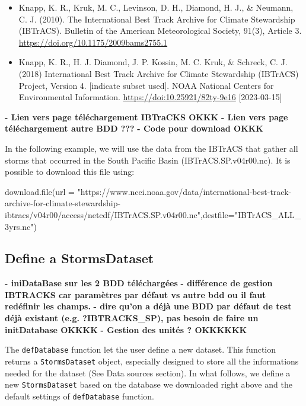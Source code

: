 \documentclass[
]{article}
\newenvironment{Shaded}{\begin{snugshade}}{\end{snugshade}}
\newcommand{\AttributeTok}[1]{\textcolor[rgb]{0.77,0.63,0.00}{#1}}
\newcommand{\FunctionTok}[1]{\textcolor[rgb]{0.00,0.00,0.00}{#1}}
\newcommand{\NormalTok}[1]{#1}
\newcommand{\StringTok}[1]{\textcolor[rgb]{0.31,0.60,0.02}{#1}}
\begin{document}
\begin{itemize}
\item
  Knapp, K. R., Kruk, M. C., Levinson, D. H., Diamond, H. J., \&
  Neumann, C. J. (2010). The International Best Track Archive for
  Climate Stewardship (IBTrACS). Bulletin of the American Meteorological
  Society, 91(3), Article 3.
  \url{https://doi.org/10.1175/2009bams2755.1}
\item
  Knapp, K. R., H. J. Diamond, J. P. Kossin, M. C. Kruk, \& Schreck, C.
  J. (2018) International Best Track Archive for Climate Stewardship
  (IBTrACS) Project, Version 4. {[}indicate subset used{]}. NOAA
  National Centers for Environmental Information.
  \url{https://doi:10.25921/82ty-9e16} {[}2023-03-15{]}
\end{itemize}

\textbf{- Lien vers page téléchargement IBTraCKS OKKK}
\textbf{- Lien vers page téléchargement autre BDD ???}
\textbf{- Code pour download OKKK}

In the following example, we will use the data from the IBTrACS that
gather all storms that occurred in the South Pacific Basin
(IBTrACS.SP.v04r00.nc). It is possible to download this file using:

\begin{Shaded}
\begin{Highlighting}[]
\FunctionTok{download.file}\NormalTok{(}\AttributeTok{url =} \StringTok{"https://www.ncei.noaa.gov/data/international{-}best{-}track{-}archive{-}for{-}climate{-}stewardship{-}ibtracs/v04r00/access/netcdf/IBTrACS.SP.v04r00.nc"}\NormalTok{,}\AttributeTok{destfile=}\StringTok{"IBTrACS\_ALL\_3yrs.nc"}\NormalTok{)}
\end{Highlighting}
\end{Shaded}

\hypertarget{define-a-stormsdataset}{%
\subsection{Define a StormsDataset}\label{define-a-stormsdataset}}

\textbf{- iniDataBase sur les 2 BDD téléchargées}
\textbf{- différence de gestion IBTRACKS car paramètres par défaut vs autre bdd ou il faut redéfinir les champs.}
\textbf{- dire qu'on a déjà une BDD par défaut de test déjà existant (e.g. ?IBTRACKS\_SP), pas besoin de faire un initDatabase OKKKK}
\textbf{- Gestion des unités ? OKKKKKK}

The \texttt{defDatabase} function let the user define a new dataset.
This function returns a \texttt{StormsDataset} object, especially
designed to store all the informations needed for the dataset (See Data
sources section). In what follows, we define a new
\texttt{StormsDataset} based on the database we downloaded right above
and the default settings of \texttt{defDatabase} function.
\end{document}
